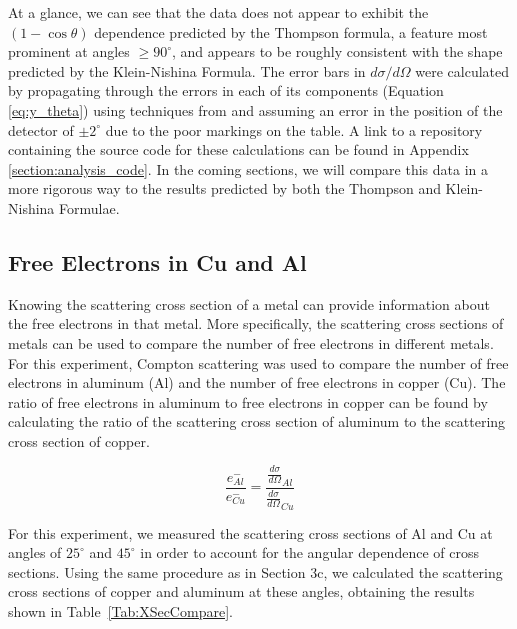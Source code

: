 \documentclass[%
 reprint,
 amsmath,amssymb,
 aps,
 pra,
]{revtex4-1}
\begin{document}
\noindent At a glance, we can see that the data does not appear to exhibit the $(1 - \cos{\theta})$ dependence predicted by the Thompson formula, a feature most prominent at angles $\ge 90^\circ$, and appears to be roughly consistent with the shape predicted by the Klein-Nishina Formula. The error bars in $d \sigma / d\Omega$ were calculated by propagating through the errors in each of its components (Equation \ref{eq:y_theta}) using techniques from \cite{bevington} and assuming an error in the position of the detector of $\pm 2^\circ$ due to the poor markings on the table. A link to a repository containing the source code for these calculations can be found in Appendix \ref{section:analysis_code}. In the coming sections, we will compare this data in a more rigorous way to the results predicted by both the Thompson and Klein-Nishina Formulae.

\subsection{Free Electrons in Cu and Al}

Knowing the scattering cross section of a metal can provide information about the free electrons in that metal. More specifically, the scattering cross sections of metals can be used to compare the number of free electrons in different metals. For this experiment, Compton scattering was used to compare the number of free electrons in aluminum (Al) and the number of free electrons in copper (Cu). The ratio of free electrons in aluminum to free electrons in copper can be found by calculating the ratio of the scattering cross section of aluminum to the scattering cross section of copper.

\begin{equation}
\frac{e^{-}_{Al}}{e^{-}_{Cu}} = \frac{\frac{d\sigma}{d\Omega}_{Al}}{\frac{d\sigma}{d\Omega}_{Cu}}
\end{equation}

For this experiment, we measured the scattering cross sections of Al and Cu at angles of $25^{\circ}$ and $45^{\circ}$ in order to account for the angular dependence of cross sections. Using the same procedure as in Section 3c, we calculated the scattering cross sections of copper and aluminum at these angles, obtaining the results shown in Table~\ref{Tab:XSecCompare}. 
\end{document}
